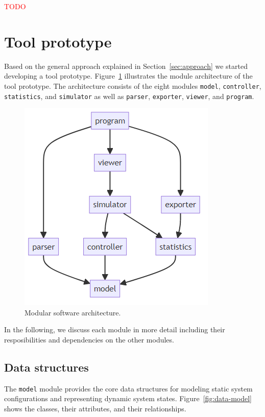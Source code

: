 \documentclass[10pt,twocolumn]{article}
\begin{document}
\textcolor{red}{TODO}

\section{Tool prototype}
\label{sec:tool-prototype}

Based on the general approach explained in Section~\ref{sec:approach} we started developing a tool prototype.
Figure~\ref{fig:software-architecture} illustrates the module architecture of the tool prototype.
The architecture consists of the eight modules \texttt{model}, \texttt{controller}, \texttt{statistics}, and \texttt{simulator} as well as \texttt{parser}, \texttt{exporter}, \texttt{viewer}, and \texttt{program}.

\begin{figure}[!ht]
    \centering
    \includegraphics[scale=0.4]{../../diagrams/architecture-v2.png}
    \caption{Modular software architecture.}
    \label{fig:software-architecture}
\end{figure}

In the following, we discuss each module in more detail including their resposibilities and dependencies on the other modules.

\subsection{Data structures}
\label{sec:data-model}

The \texttt{model} module provides the core data structures for modeling static system configurations and representing dynamic system states.
Figure~\ref{fig:data-model} shows the classes, their attributes, and their relationships.
\end{document}

